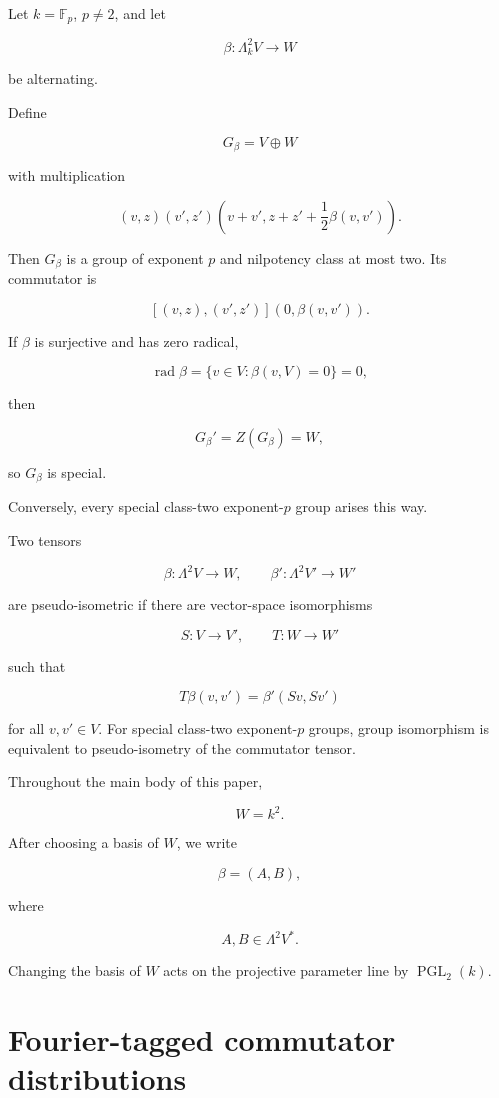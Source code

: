 \documentclass[11pt]{article}
\begin{document}
Let $k=\mathbb F_p$, $p\neq2$, and let

\[
\beta:\Lambda^2_k V\to W
\]

be alternating.

Define

\[
G_\beta=V\oplus W
\]

with multiplication

\[
(v,z)(v',z')
\left(
v+v',
z+z'+\frac12\beta(v,v')
\right).
\]

Then $G_\beta$ is a group of exponent $p$ and nilpotency class at most two. Its commutator is

\[
[(v,z),(v',z')]
(0,\beta(v,v')).
\]

If $\beta$ is surjective and has zero radical,

\[
\operatorname{rad}\beta
=
\{v\in V:\beta(v,V)=0\}=0,
\]

then

\[
G_\beta'=Z(G_\beta)=W,
\]

so $G_\beta$ is special.

Conversely, every special class-two exponent-$p$ group arises this way.

Two tensors

\[
\beta:\Lambda^2V\to W,
\qquad
\beta':\Lambda^2V'\to W'
\]

are pseudo-isometric if there are vector-space isomorphisms

\[
S:V\to V',
\qquad
T:W\to W'
\]

such that

\[
T\beta(v,v')=\beta'(Sv,Sv')
\]

for all $v,v'\in V$. For special class-two exponent-$p$ groups, group isomorphism is equivalent to pseudo-isometry of the commutator tensor.

Throughout the main body of this paper,

\[
W=k^2.
\]

After choosing a basis of $W$, we write

\[
\beta=(A,B),
\]

where

\[
A,B\in\Lambda^2V^*.
\]

Changing the basis of $W$ acts on the projective parameter line by $\operatorname{PGL}_2(k)$.

\section{Fourier-tagged commutator distributions}
\end{document}
